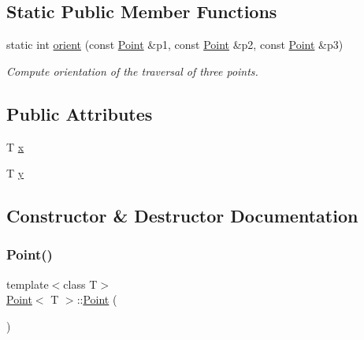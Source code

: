 \subsection*{Static Public Member Functions}
\begin{DoxyCompactItemize}
\item 
static int \mbox{\hyperlink{classPoint_a825f7be514210803676ed97b988ad7a0}{orient}} (const \mbox{\hyperlink{classPoint}{Point}} \&p1, const \mbox{\hyperlink{classPoint}{Point}} \&p2, const \mbox{\hyperlink{classPoint}{Point}} \&p3)
\begin{DoxyCompactList}\small\item\em Compute orientation of the traversal of three points. \end{DoxyCompactList}\end{DoxyCompactItemize}
\subsection*{Public Attributes}
\begin{DoxyCompactItemize}
\item 
T \mbox{\hyperlink{classPoint_a401d07562afaf0079121218025e66b76}{x}}
\item 
T \mbox{\hyperlink{classPoint_a65146418a33ebb2cd9acb85cade60ac9}{y}}
\end{DoxyCompactItemize}


\subsection{Constructor \& Destructor Documentation}
\mbox{\label{classPoint_aea76b1130f1a203722d8f2254ced8e66}} 
\subsubsection{\texorpdfstring{Point()}{Point()}\hspace{0.1cm}{\footnotesize\ttfamily [1/2]}}
{\footnotesize\ttfamily template$<$class T$>$ \\
\mbox{\hyperlink{classPoint}{Point}}$<$ T $>$\+::\mbox{\hyperlink{classPoint}{Point}} (\begin{DoxyParamCaption}{ }\end{DoxyParamCaption})\hspace{0.3cm}{\ttfamily [inline]}}

\mbox{\label{classPoint_a6583d71c9cddfe6e079135c724ea228c}} 
